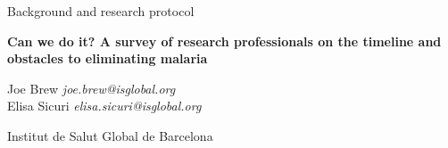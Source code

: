 \documentclass{article}
\begin{document}


\vspace{20mm}


\begin{Large}
\begin{center}
Background and research protocol
\end{center}
\end{Large}


\begin{large}
\begin{center}
\textbf{Can we do it? A survey of research professionals on the timeline and obstacles to eliminating malaria} 
\end{center}
\end{large}


\vspace{5mm}

\begin{changemargin}{2.5cm}{2.5cm} 
\begin{center}
\begin{large}
Joe Brew \hfill \emph{joe.brew@isglobal.org} \\
Elisa Sicuri \hfill \emph{elisa.sicuri@isglobal.org} \\ 
\end{large}
\end{center}
\end{changemargin}


\vspace{6mm}

\begin{center}
\begin{large}
Institut de Salut Global de Barcelona 
\end{large}
\end{center}
\end{document}
